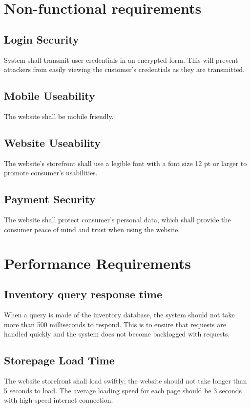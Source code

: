 \documentclass{scrreprt}
\theoremstyle{funreq}
\begin{document}
	\section{Non-functional requirements}
	\subsection{Login Security}
	System shall transmit user credentials in an encrypted form.  This will prevent attackers from easily viewing the customer's credentials as they are transmitted.  
	
    \subsection{Mobile Useability}
	The website shall be mobile friendly.

    \subsection{Website Useability}
    The website’s storefront shall use a legible font with a font size 12 pt or larger to promote consumer’s usabilities.

    \subsection{Payment Security}
    The website shall protect consumer’s personal data, which shall provide the consumer peace of mind and trust when using the website.

	\section{Performance Requirements}
	\subsection{Inventory query response time}
	When a query is made of the inventory database, the system should not take more than 500 milliseconds to respond.  This is to ensure that requests are handled quickly and the system does not become backlogged with requests.
	
	\subsection{Storepage Load Time}
	The website storefront shall load swiftly; the website should not take longer than 5 seconds to load. The average loading speed for each page should be 3 seconds with high speed internet connection.
	
\end{document}
